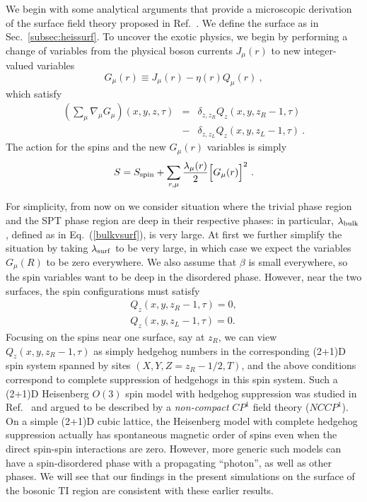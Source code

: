 \documentclass[prb,twocolumn]{revtex4-1}
\begin{document}
We begin with some analytical arguments that provide a microscopic derivation of the surface field theory proposed in Ref.~.
We define the surface as in Sec.~\ref{subsec:heissurf}. To uncover the exotic physics, we begin by performing a change of variables from the physical boson currents $J_\mu(r)$ to new integer-valued variables
\begin{equation}
G_\mu(r) \equiv J_\mu(r) - \eta(r) Q_\mu(r) ~,
\end{equation}
which satisfy 
\begin{eqnarray*}
\left(\sum_\mu \nabla_\mu G_\mu\right) (x, y, z, \tau) &=& 
\delta_{z, z_R} Q_z(x, y, z_R-1, \tau) \\
&-& \delta_{z, z_L} Q_z(x, y, z_L-1, \tau) ~. 
\end{eqnarray*}
The action for the spins and the new $G_\mu(r)$ variables is simply
\begin{equation}
S = S_{\rm spin} + \sum_{r,\mu} \frac{\lambda_\mu(r)}{2} \Big[G_\mu(r)\Big]^2 ~.
\end{equation}

For simplicity, from now on we consider situation where the trivial phase region and the SPT phase region are deep in their respective phases: in particular, $\lambda_{\rm bulk}$, defined as in Eq.~(\ref{bulkvsurf}), is very large.  At first we further simplify the situation by taking $\lambda_{\rm surf}$ to be very large, in which case we expect the variables $G_\mu(R)$ to be zero everywhere.  We also assume that $\beta$ is small everywhere, so the spin variables want to be deep in the disordered phase.  However, near the two surfaces, the spin configurations must satisfy
\begin{equation}
\begin{array}{c}
Q_z(x, y, z_R-1, \tau) = 0, \\
Q_z(x, y, z_L-1, \tau) = 0.
\end{array}
\end{equation}
Focusing on the spins near one surface, say at $z_R$, we can view $Q_z(x, y, z_R-1, \tau)$ as simply hedgehog numbers in the corresponding (2+1)D spin system spanned by sites $(X, Y, Z=z_R-1/2, T)$, and the above conditions correspond to complete suppression of hedgehogs in this spin system.  Such a (2+1)D Heisenberg $O(3)$ spin model with hedgehog suppression was studied in Ref.~ and argued to be described by a \emph{non-compact} $CP^1$ field theory ($NCCP^1$).  On a simple (2+1)D cubic lattice, the Heisenberg model with complete hedgehog suppression actually has spontaneous magnetic order of spins even when the direct spin-spin interactions are zero.\cite{LauDasgupta, KamalMurthy}  However, more generic such models can have a spin-disordered phase with a propagating ``photon''\cite{KamalMurthy, LesikAshvin}, as well as other phases\cite{LesikAshvin2}.  We will see that our findings in the present simulations on the surface of the bosonic TI region are consistent with these earlier results.
\end{document}
